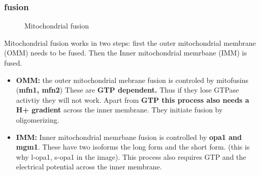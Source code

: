 \documentclass[../main.tex]{subfiles}
\begin{document}
\subsubsection{fusion}
\begin{figure}[H]
	\centering
	\caption{Mitochondrial fusion}
\end{figure}
Mitochondrial fusion works in two steps: first the outer mitochondrial membrane (OMM) needs to be fused. Then the Inner mitochondrial memrbane (IMM) is fused. 
\begin{itemize}
    \item \textbf{OMM:} the outer mitochondrial mebrane fusion is controled by mitofusins (\textbf{\gls{mfn1}, \gls{mfn2}}) These are \textbf{GTP dependent.} Thus if they lose GTPase activtiy they will not work. Apart from \textbf{GTP this process also needs a H+ gradient} across the inner membrane. They initiate fusion by oligomerizing. 

    \item \textbf{IMM:} Inner mitochondrial memrbane fusion is controlled by \textbf{\gls{opa1} and \gls{mgm1}}. These have two isoforms the long form and the short form. (this is why l-opa1, s-opa1 in the image). This process also requires GTP and the electrical potential across the inner membrane. 
\end{itemize}



	
\end{document}
